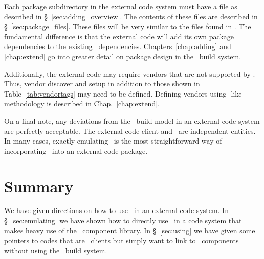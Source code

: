 Each package subdirectory in the external code system must have a
 file as described in \S~\ref{sec:adding_overview}.
The contents of these files are described in
\S~\ref{sec:package_files}.  These files will be very similar to the
 files found in \draco.  The fundamental
difference is that the external code will add its own package
dependencies to the existing \draco\ dependencies.
Chapters~\ref{chap:adding} and \ref{chap:extend} go into greater
detail on package design in the \draco\ build system.

Additionally, the external code may require vendors that are not
supported by \draco.  Thus, vendor discover and setup in addition to those shown in
Table~\ref{tab:vendortags} may need to be defined.  Defining vendors
using \draco-like methodology is described in
Chap.~\ref{chap:extend}.  

On a final note, any deviations from the \draco\ build model in an
external code system are perfectly acceptable.  The external code
client and \draco\ are independent entities.  In many cases, exactly
emulating \draco\ is the most straightforward way of incorporating
\draco\ into an external code package.  


\section{Summary}

We have given directions on how to use \draco\ in an external code
system.  In \S~\ref{sec:emulating} we have shown how to directly use
\draco\ in a code system that makes heavy use of the \draco\ component 
library.  In \S~\ref{sec:using} we have given some pointers to codes
that are \draco\ clients but simply want to link to \draco\
components without using the \draco\ build system.